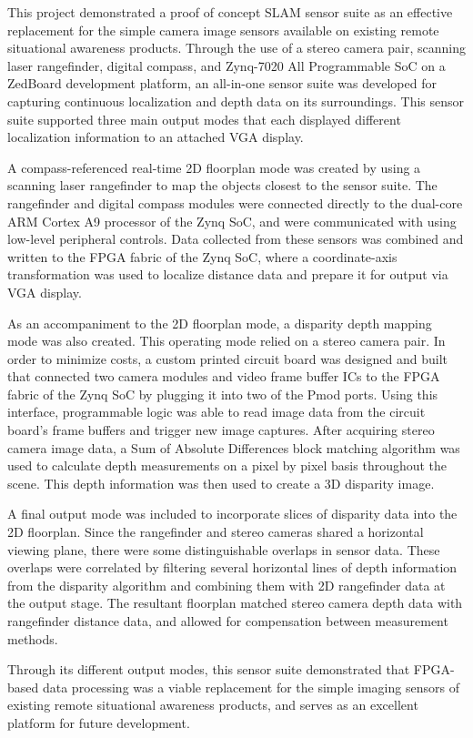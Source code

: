 This project demonstrated a proof of concept SLAM sensor suite as an effective replacement for the simple camera image sensors available on existing remote situational awareness products. Through the use of a stereo camera pair, scanning laser rangefinder,  digital compass, and Zynq-7020 All Programmable SoC on a ZedBoard development platform, an all-in-one sensor suite was developed for capturing continuous localization and depth data on its surroundings. This sensor suite supported three main output modes that each displayed different localization information to an attached VGA display.
\par
A compass-referenced real-time 2D floorplan mode was created by using a scanning laser rangefinder to map the objects closest to the sensor suite. The rangefinder and digital compass modules were connected directly to the dual-core ARM Cortex A9 processor of the Zynq SoC, and were communicated with using low-level peripheral controls. Data collected from these sensors was combined and written to the FPGA fabric of the Zynq SoC, where a coordinate-axis transformation was used to localize distance data and prepare it for output via VGA display.
\par
As an accompaniment to the 2D floorplan mode, a disparity depth mapping mode was also created. This operating mode relied on a stereo camera pair. In order to minimize costs, a custom printed circuit board was designed and built that connected two camera modules and video frame buffer ICs to the FPGA fabric of the Zynq SoC by plugging it into two of the Pmod ports. Using this interface, programmable logic was able to read image data from the circuit board's frame buffers and trigger new image captures. After acquiring stereo camera image data, a Sum of Absolute Differences block matching algorithm was used to calculate depth measurements on a pixel by pixel basis throughout the scene. This depth information was then used to create a 3D disparity image.
\par
A final output mode was included to incorporate slices of disparity data into the 2D floorplan. Since the rangefinder and stereo cameras shared a horizontal viewing plane, there were some distinguishable overlaps in sensor data. These overlaps were correlated by filtering several horizontal lines of depth information from the disparity algorithm and combining them with 2D rangefinder data at the output stage. The resultant floorplan matched stereo camera depth data with rangefinder distance data, and allowed for compensation between measurement methods.
\par
Through its different output modes, this sensor suite demonstrated that FPGA-based data processing was a viable replacement for the simple imaging sensors of existing remote situational awareness products, and serves as an excellent platform for future development.

